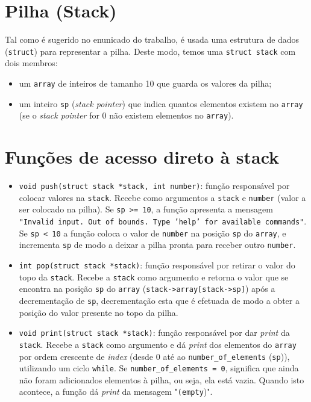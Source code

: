 \documentclass[12pt, a4paper]{article}
\begin{document}
    \section{Pilha (Stack)}
        Tal como é sugerido no enunicado do trabalho, é usada uma estrutura de dados (\texttt{struct}) para representar a pilha. Deste modo, temos uma \texttt{struct stack} com dois membros:
        \begin{itemize}
            \item um \texttt{array} de inteiros de tamanho 10 que guarda os valores da pilha;
            \item um inteiro \texttt{sp} (\textit{stack pointer}) que indica quantos elementos existem no \texttt{array} (se  o \textit{stack pointer} for 0 não existem elementos no \texttt{array}).
        \end{itemize}
        
    \section{Funções de acesso direto à stack}
    \begin{itemize}
        \item \texttt{void push(struct stack *stack, int number)}: função responsável por colocar valores na \texttt{stack}. Recebe como argumentos a \texttt{stack} e \texttt{number} (valor a ser colocado na pilha). Se \texttt{sp >= 10}, a função apresenta a mensagem \texttt{"Invalid input. Out of bounds. Type 'help' for available commands"}. Se \texttt{sp < 10} a função coloca o valor de \texttt{number} na posição \texttt{sp} do \texttt{array}, e incrementa \texttt{sp} de modo a deixar a pilha pronta para receber outro \texttt{number}.
        
        \item \texttt{int pop(struct stack *stack)}: função responsável por retirar o valor do topo da \texttt{stack}. Recebe a \texttt{stack} como argumento e retorna o valor que se encontra na posição \texttt{sp} do \texttt{array} (\texttt{stack->array[stack->sp]}) após a decrementação de \texttt{sp}, decrementação esta que é efetuada de modo a obter a posição do valor presente no topo da pilha.
        
        \item \texttt{void print(struct stack *stack)}: função responsável por dar \textit{print} da \texttt{stack}. Recebe a \texttt{stack} como argumento e dá \textit{print} dos elementos do \texttt{array} por ordem crescente de \textit{index} (desde 0 até ao \texttt{number\_of\_elements} (\texttt{sp})), utilizando um ciclo \texttt{while}. Se \texttt{number\_of\_elements = 0}, significa que ainda não foram adicionados elementos à pilha, ou seja, ela está vazia. Quando isto acontece, a função dá \textit{print} da mensagem "\texttt{(empty})".
    \end{itemize}
    
\end{document}
